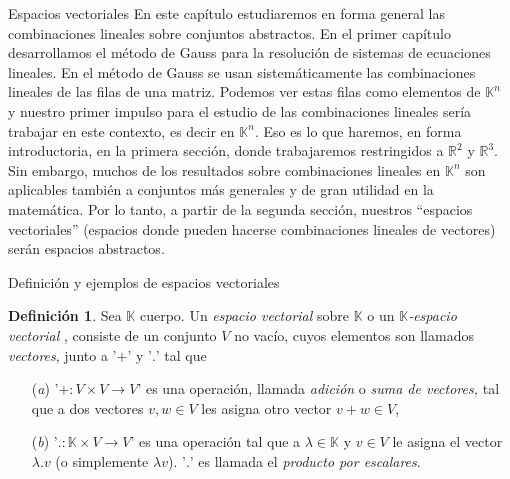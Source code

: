 \documentclass[a4paper,12pt,twoside,spanish,reqno]{amsbook}
\theoremstyle{definition}
\newtheorem{definicion}{Definici\'on}[section]
\theoremstyle{remark}
\newcommand{\R}{\mathbb R}
\newcommand{\K}{\mathbb K}
\begin{document}
	\begin{chapter}{Espacios vectoriales}\label{chap-esp-vect} En este capítulo estudiaremos en forma general las combinaciones lineales sobre conjuntos abstractos.
		En el primer capítulo desarrollamos el método de Gauss para la resolución de sistemas de ecuaciones lineales. En el método de Gauss se usan sistemáticamente las combinaciones lineales de las filas de una matriz. Podemos ver estas filas como elementos de $\K^n$  y nuestro primer impulso para el estudio de las combinaciones lineales sería trabajar en este contexto, es decir  en $\K^n$. Eso es lo que haremos, en forma introductoria, en la primera sección, donde trabajaremos restringidos a   $\R^2$ y $\R^3$.   Sin embargo, muchos de los resultados sobre combinaciones lineales en $\K^n$ son aplicables también a conjuntos más generales y de gran utilidad en la matemática. Por lo tanto,  a partir de la segunda sección,  nuestros ``espacios vectoriales'' (espacios donde pueden hacerse combinaciones lineales de vectores) serán espacios abstractos. 
		

		

		
		\begin{section}{Definición y ejemplos de espacios vectoriales}
			
			\begin{definicion}\label{def-esp-vect} Sea $\K$ cuerpo. Un \textit{espacio vectorial} sobre $\K$ o un \textit{$\K$-espacio vectorial }, consiste de  un  conjunto $V$ no vacío, cuyos elementos son llamados \textit{vectores}, junto a  '$+$' y '$.$' tal que
				\begin{enumerate}
					\item[(\textit{a})] '$+\colon V\times V\to V$' es una operación, llamada \textit{adición} o  \textit{suma de vectores,} tal que a dos vectores $v,w \in V$ les asigna otro vector $v+w \in V$,
					\item[(\textit{b})]  '$.
                     \colon \K\times V\to V$' es una operación tal que a $\lambda \in \K$ y $v \in V$ le asigna el vector $\lambda.v$ (o simplemente $\lambda v$).  '$.$' es llamada  el \textit{producto por escalares}.
					

\end{enumerate}
\end{definicion}
\end{section}
\end{chapter}
\end{document}
